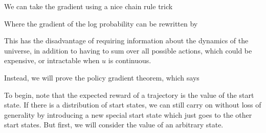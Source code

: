\documentclass[12pt]{article}
\begin{document}

We can take the gradient using a nice chain rule trick


Where the gradient of the log probability can be rewritten by

This has the disadvantage of requiring information about the dynamics of the universe, in addition to having to sum over all possible actions, which could be expensive, or intractable when $u$ is continuous.

Instead, we will prove the policy gradient theorem, which says


To begin, note that the expected reward of a trajectory is the value of the start state. If there is a distribution of start states, we can still carry on without loss of generality by introducing a new special start state which just goes to the other start states. But first, we will consider the value of an arbitrary state.

\end{document}
